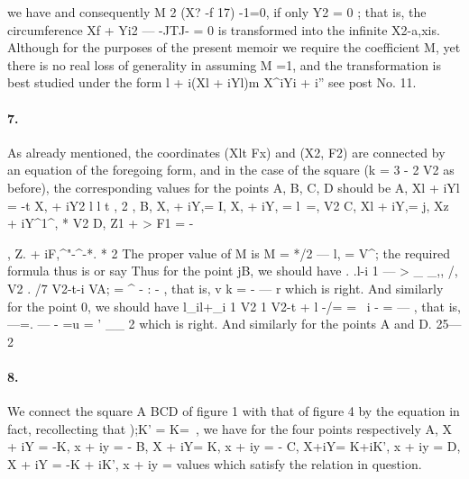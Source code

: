 \documentclass[11pt,a4paper]{book}
\begin{document}
{{{{we  have
and    consequently    M  2  (X?  -f  17)  -1=0,    if    only    Y2  =  0  ;     that    is,    the    circumference
Xf  +  Yi2  ---  -JTJ-  =  0  is  transformed  into  the  infinite  X2-a,xis.
Although  for  the  purposes  of  the  present  memoir  we  require  the  coefficient  M,
yet  there  is  no  real  loss  of  generality  in  assuming  M  =1,  and  the  transformation  is
best  studied  under  the  form
l  +  i(Xl  +  iYl)m
X^iYi  +  i''
see  post  No.  11.
\paragraph{7.} As  already  mentioned,  the  coordinates  (Xlt  Fx)  and  (X2,  F2)  are  connected  by
an  equation  of  the  foregoing  form,  and  in  the  case  of  the  square  (k  =  3  -  2  V2  as
before),  the  corresponding  values  for  the  points  A,  B,  C,  D  should  be
A,        Xl  +  iYl  =  -t     X,  +  iY2
l         l  t        ,         2  ,
B,  X,  +  iY,=     I,     X,  +  iY,  =  l~=,
V2
C,  Xl  +  iY,=     j,     Xz  +  iY^1^,
*  V2
D,  Z1  +  > F1  =  -},     Z.  +  iF,^"-^-*.
*  \/2
The  proper  value  of  M  is  M  =  */2  ---  l,  =  V^;  the  required  formula  thus  is
or  say
Thus  for  the  point  jB,  we  should  have
.      .l-i
1    ---   >    \_  \_,,
/,  V2  .     /7     V2-t-i
VA;  =  ^  -  :  -  ,  that  is,  v  k  =  -  ---  r
 which  is  right.     And  similarly  for  the  point  0,  we  should  have
l\_il+\_i
1  V2  1        V2-t  +  l
-/=   =  ~i  -  =  ---  ,  that  is,  ---=.  ---  -  =u  =
'
\_\_
\/2
which  is  right.     And  similarly  for  the  points  A  and  D.
25---2


\paragraph{8.} We  connect  the  square  A  BCD  of  figure  1  with  that  of  figure  4  by  the  equation
in  fact,  recollecting  that  );K'  =  K=~,  we  have  for  the  four  points  respectively
A,  X  +  iY  =  -K,  x  +  iy  =  -
B,  X  +  iY=     K,  x  +  iy  =  -
C,  X+iY=     K+iK',  x  +  iy  =
D,  X  +  iY  =  -K  +  iK',  x  +  iy  =
values  which  satisfy  the  relation  in  question.
}}}
\end{document}
